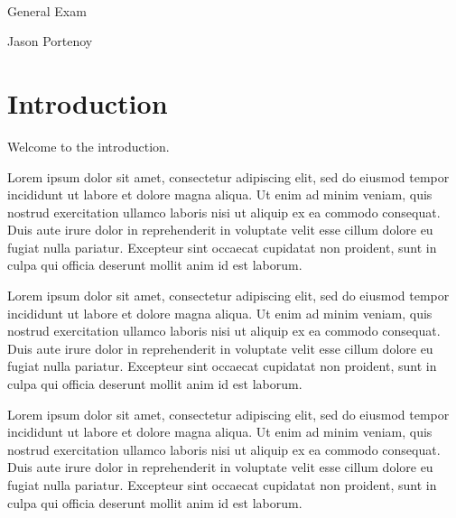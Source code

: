 \documentclass[11pt,article]{memoir}
\begin{document}
{ %
\sffamily
\centering
\Large

~\vspace{\fill}

{\huge
General Exam
}

\vspace{1in}

{\LARGE
Jason Portenoy
}

} %

\clearpage

\section{Introduction}

Welcome to the introduction.

Lorem ipsum dolor sit amet, consectetur adipiscing elit, sed do eiusmod tempor incididunt ut labore et dolore magna aliqua. Ut enim ad minim veniam, quis nostrud exercitation ullamco laboris nisi ut aliquip ex ea commodo consequat. Duis aute irure dolor in reprehenderit in voluptate velit esse cillum dolore eu fugiat nulla pariatur. Excepteur sint occaecat cupidatat non proident, sunt in culpa qui officia deserunt mollit anim id est laborum.

Lorem ipsum dolor sit amet, consectetur adipiscing elit, sed do eiusmod tempor incididunt ut labore et dolore magna aliqua. Ut enim ad minim veniam, quis nostrud exercitation ullamco laboris nisi ut aliquip ex ea commodo consequat. Duis aute irure dolor in reprehenderit in voluptate velit esse cillum dolore eu fugiat nulla pariatur. Excepteur sint occaecat cupidatat non proident, sunt in culpa qui officia deserunt mollit anim id est laborum.

Lorem ipsum dolor sit amet, consectetur adipiscing elit, sed do eiusmod tempor incididunt ut labore et dolore magna aliqua. Ut enim ad minim veniam, quis nostrud exercitation ullamco laboris nisi ut aliquip ex ea commodo consequat. Duis aute irure dolor in reprehenderit in voluptate velit esse cillum dolore eu fugiat nulla pariatur. Excepteur sint occaecat cupidatat non proident, sunt in culpa qui officia deserunt mollit anim id est laborum.
	
\end{document}

